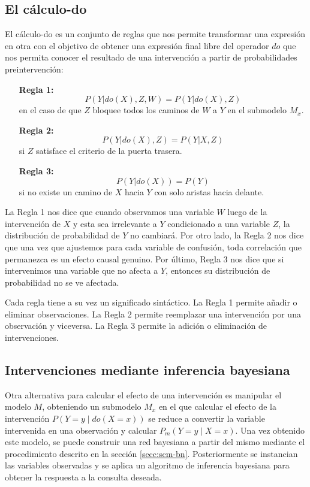 \subsection{El cálculo-do}		
El cálculo-do \cite{PearlMackenzie18} es un conjunto de reglas que nos permite transformar una expresión en otra con el objetivo de obtener una expresión final libre del operador $do$ que nos permita conocer el resultado de una intervención a partir de probabilidades preintervención:
\begin{enumerate}
	\item[\textbf{Regla 1:}] \[ P(Y|do(X), Z, W) = P(Y|do(X), Z) \] en el caso de que $Z$ bloquee todos los caminos de $W$ a $Y$ en el submodelo $M_x$.
	
	\item[\textbf{Regla 2:}] \[ P(Y|do(X), Z) = P(Y|X, Z) \] si $Z$ satisface el criterio de la puerta trasera.
	
	\item[\textbf{Regla 3:}] \[ P(Y|do(X)) = P(Y) \] si no existe un camino de $X$ hacia $Y$ con solo aristas hacia delante.		
\end{enumerate}

La Regla 1 nos dice que cuando observamos una variable $W$ luego de la intervención de $X$ y esta sea irrelevante a $Y$  condicionado a una variable $Z$, la distribución de probabilidad de $Y$ no cambiará. Por otro lado, la Regla 2 nos dice que una vez que ajustemos para cada variable de confusión, toda correlación que permanezca es un efecto causal genuino.	Por último, Regla 3 nos dice que si intervenimos una variable que no afecta a $Y$, entonces su distribución de probabilidad no se ve afectada.

Cada regla tiene a su vez un significado sintáctico. La Regla 1 permite añadir o eliminar observaciones. La Regla 2 permite reemplazar una intervención por una observación y viceversa. La Regla 3 permite la adición o eliminación de intervenciones. 

\subsection{Intervenciones mediante inferencia bayesiana}\label{sec:do-bn}
Otra alternativa para calcular el efecto de una intervención es manipular el modelo $M$, obteniendo un submodelo $M_x$ en el que calcular el efecto de la intervención $P(Y=y \mid do(X=x))$ se reduce a convertir la variable intervenida en una observación y calcular $P_m(Y=y \mid X=x)$. Una vez obtenido este modelo, se puede construir una red bayesiana a partir del mismo mediante el procedimiento descrito en la sección \ref{secc:scm-bn}. Posteriormente se instancian las variables observadas y se aplica un algoritmo de inferencia bayesiana para obtener la respuesta a la consulta deseada.


